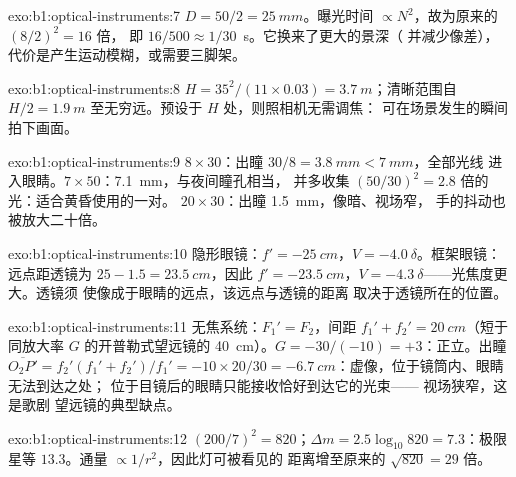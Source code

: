 \begin{solution}{exo:b1:optical-instruments:7}
$D = 50/2 = \qty{25}{mm}$。曝光时间 $\propto N^2$，故为原来的 $(8/2)^2 = 16$ 倍，
即 $16/500 \approx 1/30$~\unit{s}。它换来了更大的景深（
并减少像差），代价是产生运动模糊，或需要三脚架。
\end{solution}

\begin{solution}{exo:b1:optical-instruments:8}
$H = 35^2/(11 \times 0.03) = \qty{3.7}{m}$；清晰范围自 $H/2 =
\qty{1.9}{m}$ 至无穷远。预设于 $H$ 处，则照相机无需调焦：
可在场景发生的瞬间拍下画面。
\end{solution}

\begin{solution}{exo:b1:optical-instruments:9}
$8\times30$：出瞳 $30/8 = \qty{3.8}{mm} < \qty{7}{mm}$，全部光线
进入眼睛。$7\times50$：\qty{7.1}{mm}，与夜间瞳孔相当，
并多收集 $(50/30)^2 = 2.8$ 倍的光：适合黄昏使用的一对。
$20\times30$：出瞳 \qty{1.5}{mm}，像暗、视场窄，
手的抖动也被放大二十倍。
\end{solution}

\begin{solution}{exo:b1:optical-instruments:10}
隐形眼镜：$f' = \qty{-25}{cm}$，$V = \qty{-4.0}{\delta}$。框架眼镜：
远点距透镜为 $25 - 1.5 = \qty{23.5}{cm}$，因此 $f' =
\qty{-23.5}{cm}$，$V = \qty{-4.3}{\delta}$——光焦度更大。透镜须
使像成于眼睛的远点，该远点与透镜的距离
取决于透镜所在的位置。
\end{solution}

\begin{solution}{exo:b1:optical-instruments:11}
无焦系统：$F_1' = F_2$，间距 $f_1' + f_2' = \qty{20}{cm}$（短于
同放大率 $G$ 的开普勒式望远镜的 \qty{40}{cm}）。$G = -30/(-10) =
+3$：正立。出瞳 $\overline{O_2P'} = f_2'(f_1' + f_2')/f_1' =
-10 \times 20/30 = \qty{-6.7}{cm}$：虚像，位于镜筒内、眼睛无法到达之处；
位于目镜后的眼睛只能接收恰好到达它的光束——
视场狭窄，这是歌剧
望远镜的典型缺点。
\end{solution}

\begin{solution}{exo:b1:optical-instruments:12}
$(200/7)^2 = 820$；$\Delta m = 2.5\log_{10}820 = 7.3$：极限
星等 $13.3$。通量 $\propto 1/r^2$，因此灯可被看见的
距离增至原来的 $\sqrt{820} = 29$ 倍。
\end{solution}

